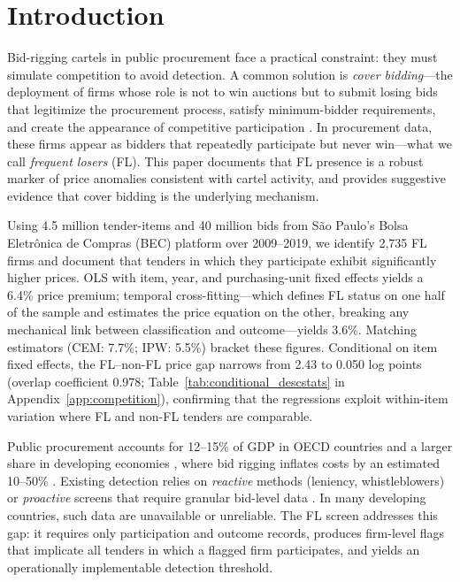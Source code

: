 \section{Introduction}
\label{sec:intro}

Bid-rigging cartels in public procurement face a practical constraint:
they must simulate competition to avoid detection. A common solution is
\emph{cover bidding}---the deployment of firms whose role is not to win
auctions but to submit losing bids that legitimize the procurement
process, satisfy minimum-bidder requirements, and create the appearance
of competitive participation
\citep{marshall2012economics, asker2010leniency}. In procurement data,
these firms appear as bidders that repeatedly participate but never
win---what we call \emph{frequent losers} (FL). This paper documents
that FL presence is a robust marker of price anomalies consistent with
cartel activity, and provides suggestive evidence that cover bidding
is the underlying mechanism.

Using 4.5 million tender-items and 40 million bids from S\~ao Paulo's
Bolsa Eletr\^onica de Compras (BEC) platform over 2009--2019, we
identify 2,735 FL firms and document that tenders in which they
participate exhibit significantly higher prices. OLS with item, year,
and purchasing-unit fixed effects yields a 6.4\% price premium;
temporal cross-fitting---which defines FL status on one half of the
sample and estimates the price equation on the other, breaking any
mechanical link between classification and outcome---yields 3.6\%.
Matching estimators (CEM: 7.7\%; IPW: 5.5\%) bracket these figures.
Conditional on item fixed effects, the FL--non-FL price gap narrows
from 2.43 to 0.050 log points (overlap coefficient 0.978;
Table~\ref{tab:conditional_descstats} in
Appendix~\ref{app:competition}), confirming that the regressions
exploit within-item variation where FL and non-FL tenders are
comparable.

Public procurement accounts for 12--15\% of GDP in OECD countries and
a larger share in developing economies \citep{oecd2019government}, where
bid rigging inflates costs by an estimated 10--50\%
\citep{connor2007price}. Existing detection relies on \emph{reactive}
methods (leniency, whistleblowers) or \emph{proactive} screens that
require granular bid-level data \citep{harrington2008detecting,
imhof2019detecting}. In many developing countries, such data are
unavailable or unreliable. The FL screen addresses this gap: it requires
only participation and outcome records, produces firm-level flags that
implicate all tenders in which a flagged firm participates, and yields
an operationally implementable detection threshold.

